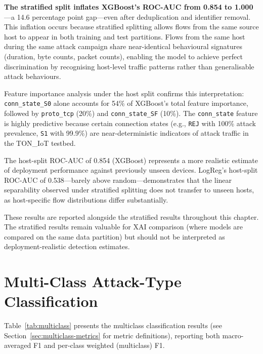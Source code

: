 \documentclass[12pt,a4paper]{report}
\begin{document}
\textbf{The stratified split inflates XGBoost's ROC-AUC from 0.854 to 1.000}---a 14.6 percentage point gap---even after deduplication and identifier removal. This inflation occurs because stratified splitting allows flows from the same source host to appear in both training and test partitions. Flows from the same host during the same attack campaign share near-identical behavioural signatures (duration, byte counts, packet counts), enabling the model to achieve perfect discrimination by recognising host-level traffic patterns rather than generalisable attack behaviours.

Feature importance analysis under the host split confirms this interpretation: \texttt{conn\_state\_S0} alone accounts for 54\% of XGBoost's total feature importance, followed by \texttt{proto\_tcp} (20\%) and \texttt{conn\_state\_SF} (10\%). The \texttt{conn\_state} feature is highly predictive because certain connection states (e.g., \texttt{REJ} with 100\% attack prevalence, \texttt{S1} with 99.9\%) are near-deterministic indicators of attack traffic in the TON\_IoT testbed.

The host-split ROC-AUC of 0.854 (XGBoost) represents a more realistic estimate of deployment performance against previously unseen devices. LogReg's host-split ROC-AUC of 0.538---barely above random---demonstrates that the linear separability observed under stratified splitting does not transfer to unseen hosts, as host-specific flow distributions differ substantially.

These results are reported alongside the stratified results throughout this chapter. The stratified results remain valuable for XAI comparison (where models are compared on the same data partition) but should not be interpreted as deployment-realistic detection estimates.

\section{Multi-Class Attack-Type Classification}
\label{sec:multiclass-results}

Table~\ref{tab:multiclass} presents the multiclass classification results (see Section~\ref{sec:multiclass-metrics} for metric definitions), reporting both macro-averaged F1 and per-class weighted (multiclass) F1.
\end{document}
